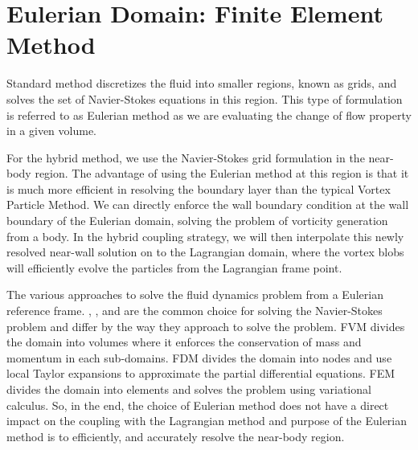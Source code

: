 \chapter{Eulerian Domain: Finite Element Method}
\label{ch:eulerian}
	

Standard  method discretizes the fluid into smaller regions, known as grids, and solves the set of Navier-Stokes equations in this region. This type of formulation is referred to as Eulerian method as we are evaluating the change of flow property in a given volume.

For the hybrid method, we use the Navier-Stokes grid formulation in the near-body region. The advantage of using the Eulerian method at this region is that it is much more efficient in resolving the boundary layer than the typical Vortex Particle Method. We can directly enforce the wall boundary condition at the wall boundary of the Eulerian domain, solving the problem of vorticity generation from a body. In the hybrid coupling strategy, we will then interpolate this newly resolved near-wall solution on to the Lagrangian domain, where the vortex blobs will efficiently evolve the particles from the Lagrangian frame point.

The various approaches to solve the fluid dynamics problem from a Eulerian reference frame. , , and  are the common choice for solving the Navier-Stokes problem and differ by the way they approach to solve the problem. FVM divides the domain into volumes where it enforces the conservation of mass and momentum in each sub-domains. FDM divides the domain into nodes and use local Taylor expansions to approximate the partial differential equations. FEM divides the domain into elements and solves the problem using variational calculus. So, in the end, the choice of Eulerian method does not have a direct impact on the coupling with the Lagrangian method and purpose of the Eulerian method is to efficiently, and accurately resolve the near-body region.

